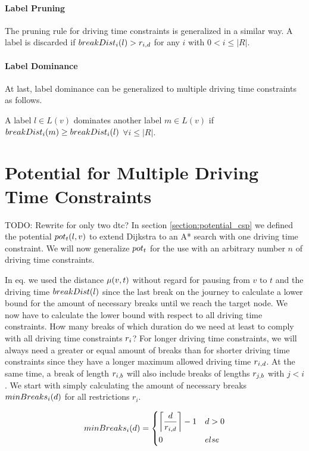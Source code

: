 \paragraph{Label Pruning}
The pruning rule for driving time constraints is generalized in a similar way. A label is discarded if $\breakDist_i(l) > \restr_{i,d}$ for any $i$ with $0 < i \le |R|$.


\paragraph{Label Dominance}
At last, label dominance can be generalized to multiple driving time constraints as follows.
\begin{definition}
	A label $l \in L(v)$ dominates another label $m \in L(v)$ if $\breakDist_i(m) \ge \breakDist_i(l)$ $\forall i \le |R|$.
\end{definition}

\section{Potential for Multiple Driving Time Constraints\label{section:potential_n_csp}}
TODO: Rewrite for only two dtc?
In section \ref{section:potential_csp} we defined the potential $\concretepotential_t(l,v)$ to extend Dijkstra to an A* search with one driving time constraint. We will now generalize $\concretepotential_t$ for the use with an arbitrary number $n$ of driving time constraints.

In eq.  we used the distance $\distance(v,t)$ without regard for pausing from $v$ to $t$ and the driving time $\breakDist(l)$ since the last break on the journey to calculate a lower bound for the amount of necessary breaks until we reach the target node. We now have to calculate the lower bound with respect to all driving time constraints. How many breaks of which duration do we need at least to comply with all driving time constraints $\restr_i$? For longer driving time constraints, we will always need a greater or equal amount of breaks than for shorter driving time constraints since they have a longer maximum allowed driving time $\restr_{i,d}$. At the same time, a break of length $\restr_{i,b}$ will also include breaks of lengths $\restr_{j,b}$ with $j < i$. We start with simply calculating the amount of necessary breaks $\minBreaks_i(d)$ for all restrictions $r_i$.

\begin{align}\label{eq:min_breaks_n}
	\minBreaks_i(d) = \begin{dcases}
		\ceil*{ \frac{d}{\restr_{i,d}} } - 1 & d > 0 \\
		0                                    & else
	\end{dcases}
\end{align}

